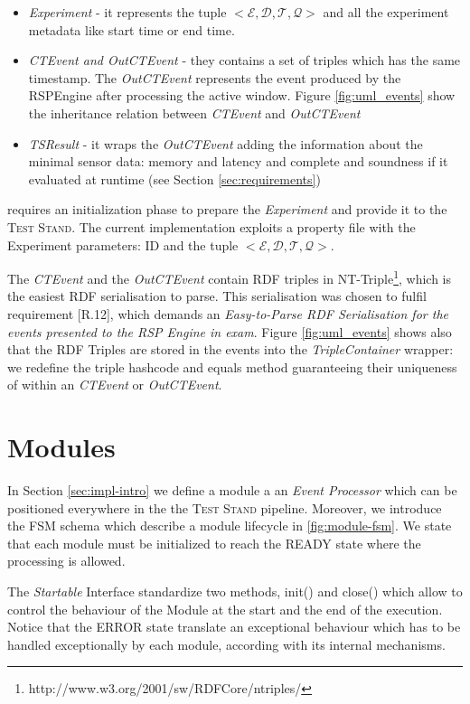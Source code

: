 \begin{itemize}
\item \textit{Experiment} - it represents the tuple $<\mathcal{E}, \mathcal{D},\mathcal{T},\mathcal{Q}>$ and all the experiment metadata like start time or end time.
\item \textit{CTEvent and OutCTEvent} - they contains a set of triples which has the same timestamp. The \textit{OutCTEvent} represents the event produced by the RSPEngine after processing the active window. Figure \ref{fig:uml_events} show the inheritance relation between \textit{CTEvent} and \textit{OutCTEvent}
\item \textit{TSResult} - it wraps the \textit{OutCTEvent} adding the information about the minimal sensor data: memory and latency and complete and soundness if it evaluated at runtime (see Section \ref{sec:requirements})
\end{itemize}

\name requires an initialization phase to prepare the \textit{Experiment} and provide it to the \textsc{Test Stand}. The current implementation exploits a property file with the Experiment parameters: ID and the tuple $<\mathcal{E}, \mathcal{D},\mathcal{T},\mathcal{Q}>$. 

The \textit{CTEvent} and the \textit{OutCTEvent} contain RDF triples in NT-Triple\footnote{http://www.w3.org/2001/sw/RDFCore/ntriples/}, which is the easiest RDF serialisation to parse. This serialisation was chosen to fulfil requirement [R.12], which demands an \textit{Easy-to-Parse RDF Serialisation for the events presented to the RSP Engine in exam}. Figure \ref{fig:uml_events} shows also that the RDF Triples are stored in the events into the \textit{TripleContainer} wrapper: we redefine the triple hashcode and equals method guaranteeing their uniqueness of within an \textit{CTEvent} or \textit{OutCTEvent}.

\section{Modules}\label{sec:modules-impl}

In Section \ref{sec:impl-intro} we define a module a an \textit{Event Processor} which can be positioned everywhere in the the \textsc{Test Stand} pipeline. Moreover, we introduce the FSM schema which describe a module lifecycle in \ref{fig:module-fsm}. We state that each module must be initialized to reach the READY state where the processing is allowed. 

The \textit{Startable} Interface standardize two methods, init() and close() which allow to control the behaviour of the Module at the start and the end of the execution. Notice that the ERROR state translate an exceptional behaviour which has to be handled exceptionally by each module, according with its internal mechanisms. 

